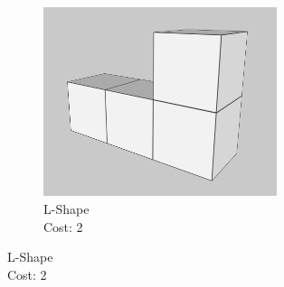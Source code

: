\begin{figure}[htbp]
\begin{subfigure}[b]{0.28\textwidth}
        \label{fig:t-shape}
    \end{subfigure}
    \hfill
    \begin{subfigure}[b]{0.28\textwidth}
        \centering
        \includegraphics[width=0.75\textwidth]{user-study-analysis/meta/shapes/l-shape.png}
        \caption{L-Shape\\Cost: 2}
        \label{fig:l-shape}
    \end{subfigure}
    
    \vspace{0.5cm}
    

\end{figure}
